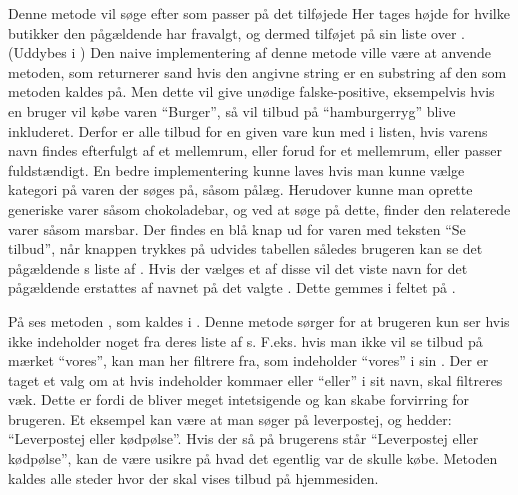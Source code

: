 Denne metode vil søge efter  som passer på det tilføjede 
Her tages højde for hvilke butikker den pågældende  har fravalgt, og dermed tilføjet på sin liste over .(Uddybes i  )
Den naive implementering af denne metode ville være at anvende  metoden, som returnerer sand hvis den angivne string er en substring af den som metoden kaldes på. 
Men dette vil give unødige falske-positive, eksempelvis hvis en bruger vil købe varen ``Burger'', så vil tilbud på ``hamburgerryg'' blive inkluderet.
Derfor er alle tilbud for en given vare kun med i listen, hvis varens navn findes efterfulgt af et mellemrum, eller forud for et mellemrum, eller passer fuldstændigt.
En bedre implementering kunne laves hvis man kunne vælge kategori på varen der søges på, såsom pålæg.
Herudover kunne man oprette generiske varer såsom chokoladebar, og ved at søge på dette, finder den relaterede varer såsom marsbar.
Der findes en blå knap ud for varen med teksten ``Se tilbud'', når knappen trykkes på udvides tabellen således brugeren kan se det pågældende s liste af .
Hvis der vælges et af disse  vil det viste navn for det pågældende  erstattes af navnet på det valgte .
Dette gemmes i feltet  på .

På  ses metoden , som kaldes i . Denne metode sørger for at brugeren kun ser  hvis  ikke indeholder noget fra deres liste af s.
F.eks. hvis man ikke vil se tilbud på mærket ``vores'', kan man her filtrere  fra, som indeholder ``vores'' i sin . 
Der er taget et valg om at  hvis  indeholder kommaer eller ``eller'' i sit navn, skal filtreres væk.
Dette er fordi de bliver meget intetsigende og kan skabe forvirring for brugeren. 
Et eksempel kan være at man søger på leverpostej, og  hedder: ``Leverpostej eller kødpølse''. 
Hvis der så på brugerens   står ``Leverpostej eller kødpølse'', kan de være usikre på hvad det egentlig var de skulle købe. 
Metoden kaldes alle steder hvor der skal vises tilbud på hjemmesiden.

